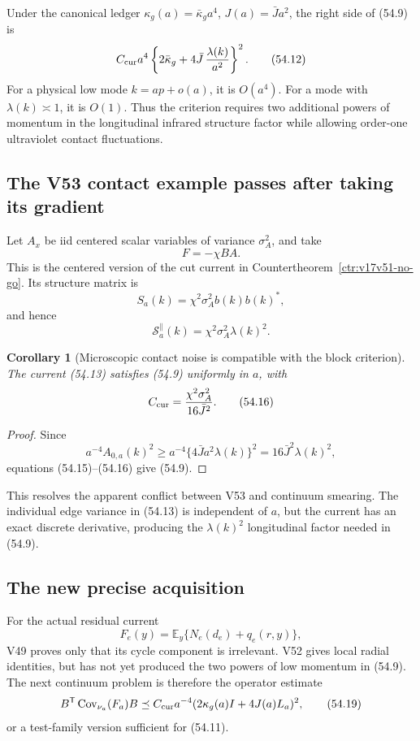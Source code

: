 \documentclass[11pt]{article}
\newtheorem{corollary}[theorem]{Corollary}
\theoremstyle{remark}
\begin{document}
Under the canonical ledger
\(\kappa_g(a)=\bar\kappa_ga^4\),
\(J(a)=\bar Ja^2\), the right side of (54.9) is
\[
 C_{\rm cur}a^4
 \left\{
 2\bar\kappa_g+
 4\bar J\,\frac{\lambda(k)}{a^2}
 \right\}^2.                                     \tag{54.12}
\]
For a physical low mode \(k=ap+o(a)\), it is \(O(a^4)\).  For a mode
with \(\lambda(k)\asymp1\), it is \(O(1)\).  Thus the criterion
requires two additional powers of momentum in the longitudinal
infrared structure factor while allowing order-one ultraviolet
contact fluctuations.

\subsection{The V53 contact example passes after taking its gradient}

Let \(A_x\) be iid centered scalar variables of variance
\(\sigma_A^2\), and take
\[
 F=-\chi BA.                                      \tag{54.13}
\]
This is the centered version of the cut current in
Countertheorem~\ref{ctr:v17v51-no-go}.  Its structure matrix is
\[
 S_a(k)=\chi^2\sigma_A^2b(k)b(k)^*,               \tag{54.14}
\]
and hence
\[
 \mathscr S_a^{\parallel}(k)
 =
 \chi^2\sigma_A^2\lambda(k)^2.                    \tag{54.15}
\]

\begin{corollary}[Microscopic contact noise is compatible with the
block criterion]
\label{cor:v17v54-gradient}
The current (54.13) satisfies (54.9) uniformly in \(a\), with
\[
 C_{\rm cur}
 =
 \frac{\chi^2\sigma_A^2}{16\bar J^2}.             \tag{54.16}
\]
\end{corollary}

\begin{proof}
Since
\[
 a^{-4}A_{0,a}(k)^2
 \geq
 a^{-4}\{4\bar Ja^2\lambda(k)\}^2
 =
 16\bar J^2\lambda(k)^2,                          \tag{54.17}
\]
equations (54.15)--(54.16) give (54.9).
\end{proof}

This resolves the apparent conflict between V53 and continuum
smearing.  The individual edge variance in (54.13) is independent of
\(a\), but the current has an exact discrete derivative, producing the
\(\lambda(k)^2\) longitudinal factor needed in (54.9).

\subsection{The new precise acquisition}

For the actual residual current
\[
 F_e(y)=\mathbb E_y\{N_e(d_e)+q_e(r,y)\},          \tag{54.18}
\]
V49 proves only that its cycle component is irrelevant.  V52 gives
local radial identities, but has not yet produced the two powers of
low momentum in (54.9).  The next continuum problem is therefore the
operator estimate
\[
 B^{\mathsf T}\operatorname{Cov}_{\nu_a}(F_a)B
 \preceq
 C_{\rm cur}a^{-4}
 (2\kappa_g(a)I+4J(a)L_a)^2,                     \tag{54.19}
\]
or a test-family version sufficient for (54.11).
\end{document}
